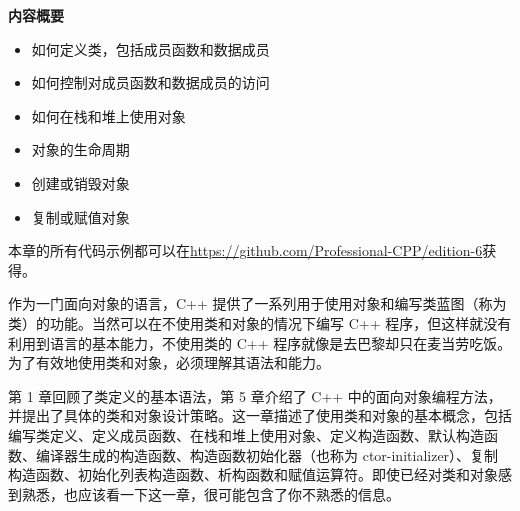 \noindent
\textbf{内容概要}

\begin{itemize}
\item
如何定义类，包括成员函数和数据成员

\item
如何控制对成员函数和数据成员的访问

\item
如何在栈和堆上使用对象

\item
对象的生命周期

\item
创建或销毁对象

\item
复制或赋值对象
\end{itemize}

本章的所有代码示例都可以在\url{https://github.com/Professional-CPP/edition-6}获得。

作为一门面向对象的语言，C++ 提供了一系列用于使用对象和编写类蓝图（称为类）的功能。当然可以在不使用类和对象的情况下编写 C++ 程序，但这样就没有利用到语言的基本能力，不使用类的 C++ 程序就像是去巴黎却只在麦当劳吃饭。为了有效地使用类和对象，必须理解其语法和能力。

第 1 章回顾了类定义的基本语法，第 5 章介绍了 C++ 中的面向对象编程方法，并提出了具体的类和对象设计策略。这一章描述了使用类和对象的基本概念，包括编写类定义、定义成员函数、在栈和堆上使用对象、定义构造函数、默认构造函数、编译器生成的构造函数、构造函数初始化器（也称为 ctor-initializer）、复制构造函数、初始化列表构造函数、析构函数和赋值运算符。即使已经对类和对象感到熟悉，也应该看一下这一章，很可能包含了你不熟悉的信息。
























